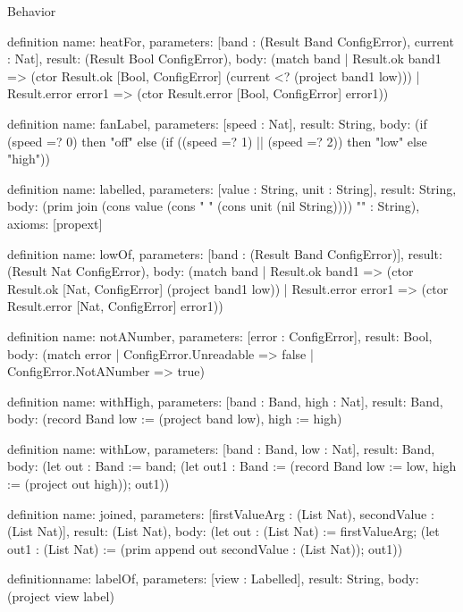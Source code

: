 \begin{lexlean}{Behavior}
\begin{semanticmodule}
definition{
  name: heatFor,
  parameters: [band : (Result Band ConfigError), current : Nat],
  result: (Result Bool ConfigError),
  body: (match band
    | Result.ok band1 => (ctor Result.ok [Bool, ConfigError] (current <? (project band1 low)))
    | Result.error error1 => (ctor Result.error [Bool, ConfigError] error1))
}

definition{
  name: fanLabel,
  parameters: [speed : Nat],
  result: String,
  body: (if (speed =? 0) then "off" else (if ((speed =? 1) || (speed =? 2)) then "low" else "high"))
}

definition{
  name: labelled,
  parameters: [value : String, unit : String],
  result: String,
  body: (prim join (cons value (cons " " (cons unit (nil String)))) "" : String),
  axioms: [propext]
}

definition{
  name: lowOf,
  parameters: [band : (Result Band ConfigError)],
  result: (Result Nat ConfigError),
  body: (match band
    | Result.ok band1 => (ctor Result.ok [Nat, ConfigError] (project band1 low))
    | Result.error error1 => (ctor Result.error [Nat, ConfigError] error1))
}

definition{
  name: notANumber,
  parameters: [error : ConfigError],
  result: Bool,
  body: (match error | ConfigError.Unreadable => false | ConfigError.NotANumber => true)
}

definition{
  name: withHigh,
  parameters: [band : Band, high : Nat],
  result: Band,
  body: (record Band {low := (project band low), high := high})
}

definition{
  name: withLow,
  parameters: [band : Band, low : Nat],
  result: Band,
  body: (let out : Band := band; (let out1 : Band := (record Band {low := low, high := (project out high)}); out1))
}

definition{
  name: joined,
  parameters: [firstValueArg : (List Nat), secondValue : (List Nat)],
  result: (List Nat),
  body: (let out : (List Nat) := firstValueArg; (let out1 : (List Nat) := (prim append out secondValue : (List Nat)); out1))
}

definition{name: labelOf, parameters: [view : Labelled], result: String, body: (project view label)}


\end{semanticmodule}
\end{lexlean}
